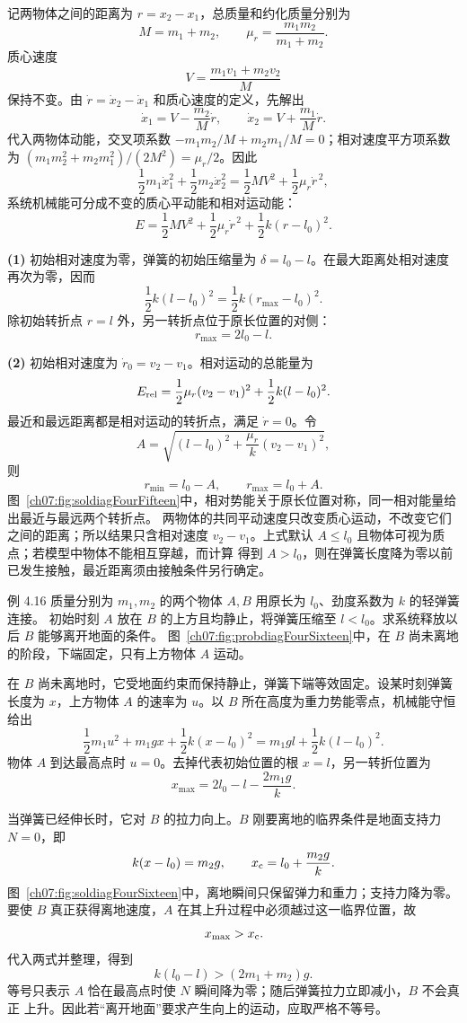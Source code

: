 \begin{xesolution}
记两物体之间的距离为 $r=x_2-x_1$，总质量和约化质量分别为
\[
 M=m_1+m_2,
 \qquad
 \mu_r=\frac{m_1m_2}{m_1+m_2}.
\]
质心速度
\[
 V=\frac{m_1v_1+m_2v_2}{M}
\]
保持不变。由 $\dot r=\dot x_2-\dot x_1$ 和质心速度的定义，先解出
\[
 \dot x_1=V-\frac{m_2}{M}\dot r,\qquad
 \dot x_2=V+\frac{m_1}{M}\dot r.
\]
代入两物体动能，交叉项系数 $-m_1m_2/M+m_2m_1/M=0$；相对速度平方项系数为
$(m_1m_2^2+m_2m_1^2)/(2M^2)=\mu_r/2$。因此
\[
 \frac12m_1\dot x_1^2+\frac12m_2\dot x_2^2
 =\frac12MV^2+\frac12\mu_r\dot r^{\,2},
\]
系统机械能可分成不变的质心平动能和相对运动能：
\[
 E=\frac12MV^2+\frac12\mu_r\dot r^{\,2}
   +\frac12k(r-l_0)^2.
\]

\textbf{(1)} 初始相对速度为零，弹簧的初始压缩量为
$\delta=l_0-l$。在最大距离处相对速度再次为零，因而
\[
 \frac12k(l-l_0)^2=\frac12k(r_{\max}-l_0)^2.
\]
除初始转折点 $r=l$ 外，另一转折点位于原长位置的对侧：
\[
 \boxed{r_{\max}=2l_0-l}.
\]

\textbf{(2)} 初始相对速度为 $\dot r_0=v_2-v_1$。相对运动的总能量为
\[
 E_{\rm rel}
 =\frac12\mu_r(v_2-v_1)^2+\frac12k(l-l_0)^2.
\]
最近和最远距离都是相对运动的转折点，满足 $\dot r=0$。令
\[
 A=\sqrt{(l-l_0)^2+\frac{\mu_r}{k}(v_2-v_1)^2},
\]
则
\[
 \boxed{r_{\min}=l_0-A},
 \qquad
 \boxed{r_{\max}=l_0+A}.
\]
图~\ref{ch07:fig:soldiagFourFifteen}中，相对势能关于原长位置对称，同一相对能量给出最近与最远两个转折点。
\soldiagFourFifteen
两物体的共同平动速度只改变质心运动，不改变它们之间的距离；所以结果只含相对速度
$v_2-v_1$。上式默认 $A\le l_0$ 且物体可视为质点；若模型中物体不能相互穿越，而计算
得到 $A>l_0$，则在弹簧长度降为零以前已发生接触，最近距离须由接触条件另行确定。
\end{xesolution}

\Needspace{0.32\textheight}
\begin{origexamplebox}{例 4.16}
质量分别为 $m_1,m_2$ 的两个物体 $A,B$ 用原长为 $l_0$、劲度系数为 $k$ 的轻弹簧连接。
初始时刻 $A$ 放在 $B$ 的上方且均静止，将弹簧压缩至 $l<l_0$。求系统释放以后 $B$
能够离开地面的条件。
图~\ref{ch07:fig:probdiagFourSixteen}中，在 $B$ 尚未离地的阶段，下端固定，只有上方物体 $A$ 运动。
\probdiagFourSixteen
\end{origexamplebox}

\begin{xesolution}
在 $B$ 尚未离地时，它受地面约束而保持静止，弹簧下端等效固定。设某时刻弹簧长度为
$x$，上方物体 $A$ 的速率为 $u$。以 $B$ 所在高度为重力势能零点，机械能守恒给出
\[
 \frac12m_1u^2+m_1gx+\frac12k(x-l_0)^2
 =m_1gl+\frac12k(l-l_0)^2.
\]
物体 $A$ 到达最高点时 $u=0$。去掉代表初始位置的根 $x=l$，另一转折位置为
\[
 x_{\max}=2l_0-l-\frac{2m_1g}{k}.
\]

当弹簧已经伸长时，它对 $B$ 的拉力向上。$B$ 刚要离地的临界条件是地面支持力
$N=0$，即
\[
 k(x-l_0)=m_2g,
 \qquad
 x_{\rm c}=l_0+\frac{m_2g}{k}.
\]
图~\ref{ch07:fig:soldiagFourSixteen}中，离地瞬间只保留弹力和重力；支持力降为零。
\soldiagFourSixteen
要使 $B$ 真正获得离地速度，$A$ 在其上升过程中必须越过这一临界位置，故
\[
 x_{\max}>x_{\rm c}.
\]
代入两式并整理，得到
\[
 \boxed{k(l_0-l)>(2m_1+m_2)g}.
\]
等号只表示 $A$ 恰在最高点时使 $N$ 瞬间降为零；随后弹簧拉力立即减小，$B$ 不会真正
上升。因此若“离开地面”要求产生向上的运动，应取严格不等号。
\end{xesolution}


